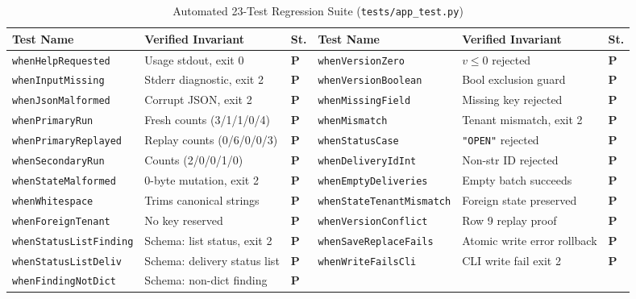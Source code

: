 \documentclass[10pt,a4paper]{article}
\begin{document}
\begin{table}[htbp]
\centering\footnotesize
\renewcommand{\arraystretch}{1.1}
\caption{Automated 23-Test Regression Suite (\texttt{tests/app\_test.py})}
\label{tab:test_results}
\begin{tabularx}{\textwidth}{@{}lXl|lXl@{}}
\toprule
\textbf{Test Name} & \textbf{Verified Invariant} & \textbf{St.} & \textbf{Test Name} & \textbf{Verified Invariant} & \textbf{St.} \\ \midrule
\texttt{whenHelpRequested} & Usage stdout, exit 0 & \textcolor{ggreen}{\textbf{P}} & \texttt{whenVersionZero} & $v \le 0$ rejected & \textcolor{ggreen}{\textbf{P}} \\
\texttt{whenInputMissing} & Stderr diagnostic, exit 2 & \textcolor{ggreen}{\textbf{P}} & \texttt{whenVersionBoolean} & Bool exclusion guard & \textcolor{ggreen}{\textbf{P}} \\
\texttt{whenJsonMalformed} & Corrupt JSON, exit 2 & \textcolor{ggreen}{\textbf{P}} & \texttt{whenMissingField} & Missing key rejected & \textcolor{ggreen}{\textbf{P}} \\
\texttt{whenPrimaryRun} & Fresh counts (3/1/1/0/4) & \textcolor{ggreen}{\textbf{P}} & \texttt{whenMismatch} & Tenant mismatch, exit 2 & \textcolor{ggreen}{\textbf{P}} \\
\texttt{whenPrimaryReplayed} & Replay counts (0/6/0/0/3) & \textcolor{ggreen}{\textbf{P}} & \texttt{whenStatusCase} & \texttt{"OPEN"} rejected & \textcolor{ggreen}{\textbf{P}} \\
\texttt{whenSecondaryRun} & Counts (2/0/0/1/0) & \textcolor{ggreen}{\textbf{P}} & \texttt{whenDeliveryIdInt} & Non-str ID rejected & \textcolor{ggreen}{\textbf{P}} \\
\texttt{whenStateMalformed} & 0-byte mutation, exit 2 & \textcolor{ggreen}{\textbf{P}} & \texttt{whenEmptyDeliveries} & Empty batch succeeds & \textcolor{ggreen}{\textbf{P}} \\
\texttt{whenWhitespace} & Trims canonical strings & \textcolor{ggreen}{\textbf{P}} & \texttt{whenStateTenantMismatch} & Foreign state preserved & \textcolor{ggreen}{\textbf{P}} \\
\texttt{whenForeignTenant} & No key reserved & \textcolor{ggreen}{\textbf{P}} & \texttt{whenVersionConflict} & Row 9 replay proof & \textcolor{ggreen}{\textbf{P}} \\
\texttt{whenStatusListFinding} & Schema: list status, exit 2 & \textcolor{ggreen}{\textbf{P}} & \texttt{whenSaveReplaceFails} & Atomic write error rollback & \textcolor{ggreen}{\textbf{P}} \\
\texttt{whenStatusListDeliv} & Schema: delivery status list & \textcolor{ggreen}{\textbf{P}} & \texttt{whenWriteFailsCli} & CLI write fail exit 2 & \textcolor{ggreen}{\textbf{P}} \\
\texttt{whenFindingNotDict} & Schema: non-dict finding & \textcolor{ggreen}{\textbf{P}} & & & \\ \bottomrule
\end{tabularx}
\end{table}
\end{document}
